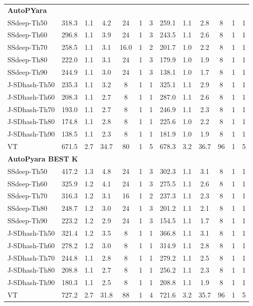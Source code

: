 \begin{table}
{\begin{tabular}{lcccccccccccc}
\multicolumn{13}{l}{\textbf{AutoPYara}} \\
SSdeep-Th50 & 318.3 & 1.1 & 4.2 & 24 & 1 & 3 & 259.1 & 1.1 & 2.8 & 8 & 1 & 1 \\
SSdeep-Th60 & 296.8 & 1.1 & 3.9 & 24 & 1 & 3 & 243.5 & 1.1 & 2.6 & 8 & 1 & 1 \\
SSdeep-Th70 & 258.5 & 1.1 & 3.1 & 16.0 & 1 & 2 & 201.7 & 1.0 & 2.2 & 8 & 1 & 1 \\
SSdeep-Th80 & 222.0 & 1.1 & 3.1 & 24 & 1 & 3 & 179.9 & 1.0 & 1.9 & 8 & 1 & 1 \\
SSdeep-Th90 & 244.9 & 1.1 & 3.0 & 24 & 1 & 3 & 138.1 & 1.0 & 1.7 & 8 & 1 & 1 \\
J-SDhash-Th50 & 235.3 & 1.1 & 3.2 & 8 & 1 & 1 & 325.1 & 1.1 & 2.9 & 8 & 1 & 1 \\
J-SDhash-Th60 & 208.3 & 1.1 & 2.7 & 8 & 1 & 1 & 287.0 & 1.1 & 2.6 & 8 & 1 & 1 \\
J-SDhash-Th70 & 193.0 & 1.1 & 2.7 & 8 & 1 & 1 & 246.9 & 1.1 & 2.3 & 8 & 1 & 1 \\
J-SDhash-Th80 & 174.8 & 1.1 & 2.8 & 8 & 1 & 1 & 225.6 & 1.0 & 2.2 & 8 & 1 & 1 \\
J-SDhash-Th90 & 138.5 & 1.1 & 2.3 & 8 & 1 & 1 & 181.9 & 1.0 & 1.9 & 8 & 1 & 1 \\
VT & 671.5 & 2.7 & 34.7 & 80 & 1 & 5 & 678.3 & 3.2 & 36.7 & 96 & 1 & 5 \\
\midrule

\multicolumn{13}{l}{\textbf{AutoPyara BEST K}} \\
SSdeep-Th50 & 417.2 & 1.3 & 4.8 & 24 & 1 & 3 & 302.3 & 1.1 & 3.1 & 8 & 1 & 1 \\
SSdeep-Th60 & 325.9 & 1.2 & 4.1 & 24 & 1 & 3 & 275.5 & 1.1 & 2.6 & 8 & 1 & 1 \\
SSdeep-Th70 & 316.3 & 1.2 & 3.1 & 16 & 1 & 2 & 237.3 & 1.1 & 2.3 & 8 & 1 & 1 \\
SSdeep-Th80 & 248.7 & 1.2 & 3.0 & 24 & 1 & 3 & 201.2 & 1.1 & 2.1 & 8 & 1 & 1 \\
SSdeep-Th90 & 223.2 & 1.2 & 2.9 & 24 & 1 & 3 & 154.5 & 1.1 & 1.7 & 8 & 1 & 1 \\
J-SDhash-Th50 & 321.4 & 1.2 & 3.5 & 8 & 1 & 1 & 366.8 & 1.1 & 3.1 & 8 & 1 & 1 \\
J-SDhash-Th60 & 278.2 & 1.2 & 3.0 & 8 & 1 & 1 & 314.9 & 1.1 & 2.8 & 8 & 1 & 1 \\
J-SDhash-Th70 & 244.8 & 1.1 & 2.8 & 8 & 1 & 1 & 279.2 & 1.1 & 2.5 & 8 & 1 & 1 \\
J-SDhash-Th80 & 208.8 & 1.1 & 2.7 & 8 & 1 & 1 & 256.2 & 1.1 & 2.3 & 8 & 1 & 1 \\
J-SDhash-Th90 & 180.3 & 1.1 & 2.5 & 8 & 1 & 1 & 208.8 & 1.1 & 1.9 & 8 & 1 & 1 \\
VT & 727.2 & 2.7 & 31.8 & 88 & 1 & 4 & 721.6 & 3.2 & 35.7 & 96 & 1 & 5 \\
\midrule


\end{tabular}}
\end{table}
